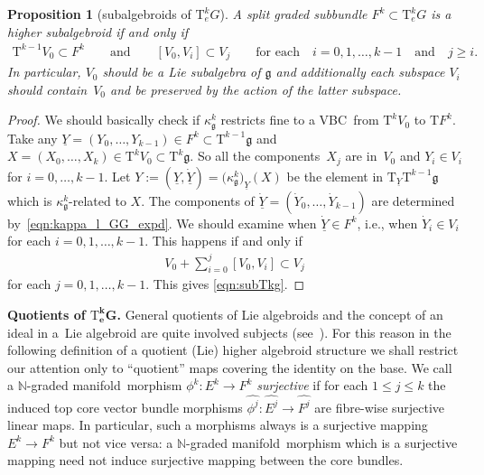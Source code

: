 \documentclass[pdftex]{sigma}
\newcommand{\grB}{{$\N$-graded manifold}}
\newcommand{\ZM}{{VBC}} %
\newcommand{\N}{\mathbb{N}}
\newcommand{\und}{\underline}
\newcommand{\ra}{\rightarrow}
\newcommand{\T}{\mathrm{T}} %
\newcommand{\TT}[1]{\mathrm{T}^{#1}} %
\newcommand{\core}[1]{\widehat{#1}} %
\newcommand{\g}{\mathfrak{g}} %
\numberwithin{equation}{section}
\newtheorem{prop}[thm]{Proposition}
\theoremstyle{definition}
\begin{document}
\begin{prop}[subalgebroids of $\TT{k}_eG$]\label{prop:sub_alg_TkG} A split graded subbundle $F^k \subset \TT{k}_e G$ is a higher subalgebroid if and only if
\begin{gather}\label{eqn:subTkg}
 \TT{k-1} V_0 \subset F^k \qquad\text{and}\qquad [V_0,V_i]\subset V_j\qquad\text{for each} \quad i=0,1,\hdots,k-1 \quad \text{and} \quad j \geq i.\!\!\!
\end{gather}
 In particular, $V_0$ should be a Lie subalgebra of $\g$ and additionally each subspace $V_i$ should contain~$V_0$ and be preserved by the action of the latter subspace.
\end{prop}
\begin{proof} We should basically check if $\kappa^k_\g$ restricts fine to a \ZM\ from $\TT{k}V_0$ to $\T F^k$.
Take any $\und{Y}=(Y_0, \hdots, Y_{k-1})\in F^k \subset \TT{k-1}\g$ and $X= (X_0,\hdots,X_k)\in \TT{k} V_0 \subset\TT{k}\g$. So all the components~$X_j$ are in~$V_0$ and $Y_i\in V_i$ for $i=0,\hdots,k-1$. Let $Y := (\und{Y}, \dot{\und{Y}}) = \big(\kappa^k_\g\big)_{\und{Y}}(X)$ be the element in $\T_{\und Y}\TT{k-1}\g$ which is $\kappa^k_\g$-related to $X$. The components of $\dot{\und Y}=(\dot Y_0,\hdots,\dot Y_{k-1})$ are determined by~\eqref{eqn:kappa_l_GG_expd}. We should examine when $\dot{\und Y}\in F^k$, i.e., when $\dot Y_i\in V_i$ for each $i=0,1,\hdots,k-1$. This happens if and only if
\begin{gather*}
 V_0 + \sum_{i=0}^j [V_0, V_i] \subset V_j
\end{gather*}
for each $j=0,1,\hdots,k-1$. This gives \eqref{eqn:subTkg}.
\end{proof}

{\bf Quotients of $\boldsymbol{\TT{k}_e G}$.} General quotients of Lie algebroids and the concept of an ideal in a~Lie algebroid are quite involved subjects (see~\cite{Mackenzie_lie_2005}). For this reason in the following definition of a quotient (Lie) higher algebroid structure we shall restrict our attention only to ``quotient'' maps covering the identity on the base. We call a \grB\ morphism $\phi^k\colon E^k\ra F^k$ \emph{surjective} if for each $1\leq j\leq k$ the induced top core vector bundle morphisms $\core{\phi^j}\colon \core{E^j}\ra \core{F^j}$ are fibre-wise surjective linear maps. In particular, such a morphisms always is a surjective mapping $E^k\ra F^k$ but not vice versa: a \grB\ morphism which is a surjective mapping need not induce surjective mapping between the core bundles.
\end{document}
